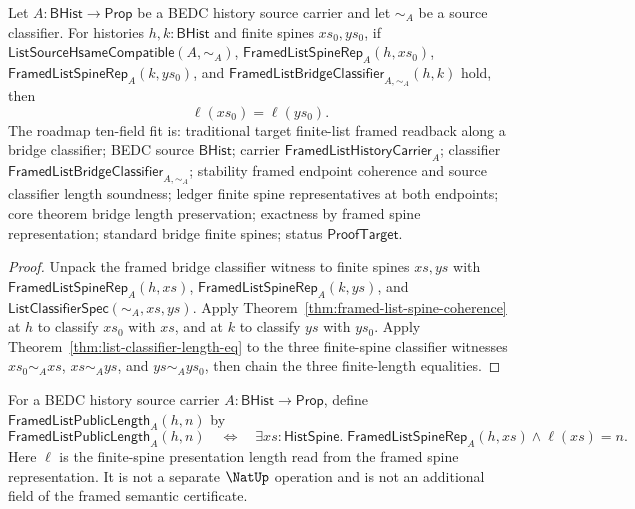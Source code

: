 \begin{theorem}
\label{thm:framed-list-bridge-classifier-represented-length}
Let $A:\mathsf{BHist}\to\mathsf{Prop}$ be a BEDC history source carrier and let
$\sim_A$ be a source classifier. For histories $h,k:\mathsf{BHist}$ and finite
spines $xs_0,ys_0$, if $\mathsf{ListSourceHsameCompatible}(A,\sim_A)$,
$\mathsf{FramedListSpineRep}_A(h,xs_0)$,
$\mathsf{FramedListSpineRep}_A(k,ys_0)$, and
$\mathsf{FramedListBridgeClassifier}_{A,\sim_A}(h,k)$ hold, then
$$
\ell(xs_0)=\ell(ys_0).
$$
The roadmap ten-field fit is: traditional target finite-list framed readback along a bridge classifier; BEDC source $\mathsf{BHist}$; carrier $\mathsf{FramedListHistoryCarrier}_A$; classifier $\mathsf{FramedListBridgeClassifier}_{A,\sim_A}$; stability framed endpoint coherence and source classifier length soundness; ledger finite spine representatives at both endpoints; core theorem bridge length preservation; exactness by framed spine representation; standard bridge finite spines; status $\mathsf{ProofTarget}$.
\end{theorem}
\begin{proof}
Unpack the framed bridge classifier witness to finite spines $xs,ys$ with
$\mathsf{FramedListSpineRep}_A(h,xs)$,
$\mathsf{FramedListSpineRep}_A(k,ys)$, and
$\mathsf{ListClassifierSpec}(\sim_A,xs,ys)$. Apply
Theorem~\ref{thm:framed-list-spine-coherence} at $h$ to classify $xs_0$ with
$xs$, and at $k$ to classify $ys$ with $ys_0$. Apply
Theorem~\ref{thm:list-classifier-length-eq} to the three finite-spine classifier
witnesses $xs_0\sim_A xs$, $xs\sim_A ys$, and $ys\sim_A ys_0$, then chain the
three finite-length equalities.
\end{proof}

\begin{definition}
\label{def:framed-list-public-length-readback}
For a BEDC history source carrier $A:\mathsf{BHist}\to\mathsf{Prop}$, define
$\mathsf{FramedListPublicLength}_A(h,n)$ by
$$
\mathsf{FramedListPublicLength}_A(h,n)
\quad\Longleftrightarrow\quad
\exists xs:\mathsf{HistSpine}.\;
\mathsf{FramedListSpineRep}_A(h,xs)\land \ell(xs)=n.
$$
Here $\ell$ is the finite-spine presentation length read from the framed spine
representation. It is not a separate $\NatUp$ operation and is not an additional
field of the framed semantic certificate.
\end{definition}

